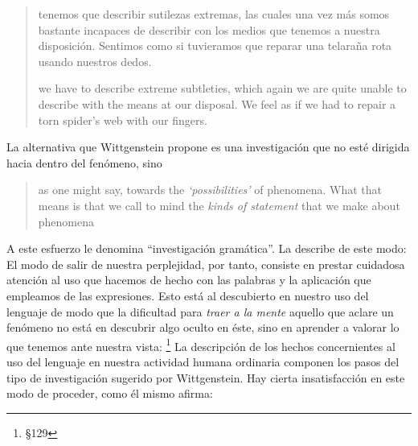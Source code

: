 \blockquote[we have to describe extreme subtleties, which again we are quite
unable to describe with the means at our disposal. We feel as if we had to
repair a torn spider's web with our fingers.
{\cite[\S106]{wittgenstein1953phiinv}}]{tenemos que describir sutilezas
  extremas, las cuales una vez más somos bastante incapaces de describir con los
  medios que tenemos a nuestra disposición. Sentimos como si tuvieramos que
  reparar una telaraña rota usando nuestros dedos.}

La alternativa que Wittgenstein propone es una investigación que no esté
dirigida hacia dentro del fenómeno, sino \blockquote{as one might say,
  towards the \emph{`possibilities'} of phenomena. What that means is that we
  call to mind the \emph{kinds of statement} that we make about phenomena}. A
este esfuerzo le denomina ``investigación gramática''. La describe de este modo:
 El modo de salir de nuestra perplejidad, por tanto,
consiste en prestar cuidadosa atención al uso que hacemos de hecho con las
palabras y la aplicación que empleamos de las expresiones. Esto está al
descubierto en nuestro uso del lenguaje de modo que la dificultad para
\emph{traer a la mente} aquello que aclare un fenómeno no está en descubrir algo
oculto en éste, sino en aprender a valorar lo que tenemos ante nuestra vista:
\footnote{\S129} La
descripción de los hechos concernientes al uso del lenguaje en nuestra actividad
humana ordinaria componen los pasos del tipo de investigación sugerido por
Wittgenstein. Hay cierta insatisfacción en este modo de proceder, como él mismo
afirma: 

